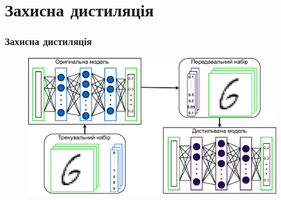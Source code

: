 \documentclass{beamer}
\numberwithin{equation}{section}
\begin{document}

	\section{Захисна дистиляція}
	\begin{frame}
		\frametitle{Захисна дистиляція}
	
		\begin{figure}[h]
			\centering
			\includegraphics[width=1\textwidth]{../images/diagrams-Distillation.pdf}
			
		\end{figure}
	\end{frame}
\end{document}
